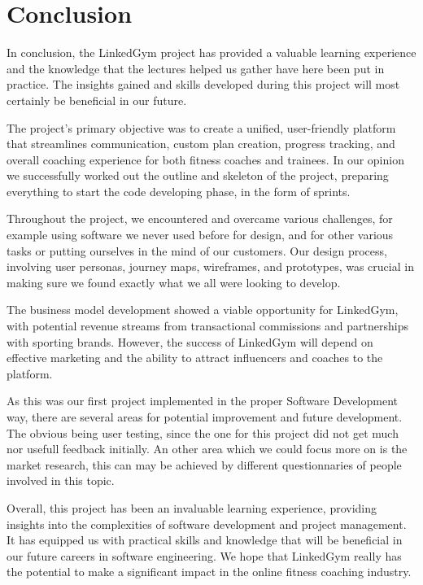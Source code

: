 \section{Conclusion}

In conclusion, the LinkedGym project has provided a valuable learning experience and the knowledge that the lectures helped us gather have here been put in practice. The insights gained and skills developed during this project will most certainly be beneficial in our future.

The project's primary objective was to create a unified, user-friendly platform that streamlines communication, custom plan creation, progress tracking, and overall coaching experience for both fitness coaches and trainees. In our opinion we successfully worked out the outline and skeleton of the project, preparing everything to start the code developing phase, in the form of sprints.

Throughout the project, we encountered and overcame various challenges, for example using software we never used before for design, and for other various tasks or putting ourselves in the mind of our customers. Our design process, involving user personas, journey maps, wireframes, and prototypes, was crucial in making sure we found exactly what we all were looking to develop.

The business model development showed a viable opportunity for LinkedGym, with potential revenue streams from transactional commissions and partnerships with sporting brands. However, the success of LinkedGym will depend on effective marketing and the ability to attract influencers and coaches to the platform.

As this was our first project implemented in the proper Software Development way, there are several areas for potential improvement and future development. The obvious being user testing, since the one for this project did not get much nor usefull feedback initially. An other area which we could focus more on is the market research, this can may be achieved by different questionnaries of people involved in this topic.

Overall, this project has been an invaluable learning experience, providing insights into the complexities of software development and project management. It has equipped us with practical skills and knowledge that will be beneficial in our future careers in software engineering. We hope that LinkedGym really has the potential to make a significant impact in the online fitness coaching industry.
\clearpage